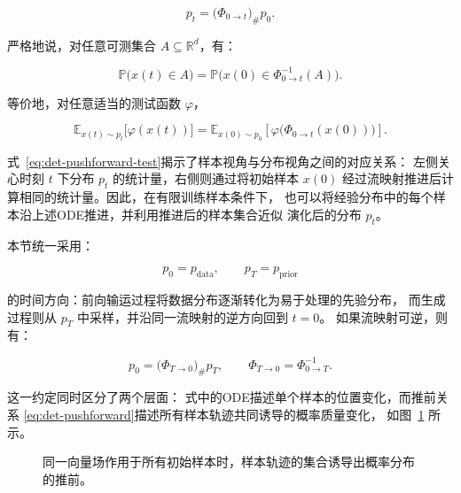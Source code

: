 \documentclass[UTF8,a4paper,zihao=-4,oneside,openany]{ctexbook}
\makeatletter
\newcommand{\AMLFigure}[2][0.96\linewidth]{%
  \begingroup
  \let\AtBeginDocument\@gobble
  \endgroup
}
\makeatother
\begin{document}
\begin{equation}
    p_t
    =
    \bigl(\Phi_{0\to t}\bigr)_{\#}p_0.
    \label{eq:det-pushforward}
\end{equation}

严格地说，对任意可测集合 $A\subseteq\mathbb{R}^{d}$，有：

\begin{equation}
    \mathbb{P}\bigl(x(t)\in A\bigr)
    =
    \mathbb{P}\bigl(
        x(0)\in\Phi_{0\to t}^{-1}(A)
    \bigr).
    \label{eq:det-pushforward-set}
\end{equation}

等价地，对任意适当的测试函数 $\varphi$，

\begin{equation}
    \mathbb{E}_{x(t)\sim p_t}
    \bigl[\varphi(x(t))\bigr]
    =
    \mathbb{E}_{x(0)\sim p_0}
    \left[
        \varphi\bigl(\Phi_{0\to t}(x(0))\bigr)
    \right].
    \label{eq:det-pushforward-test}
\end{equation}

式~\eqref{eq:det-pushforward-test}揭示了样本视角与分布视角之间的对应关系：
左侧关心时刻 $t$ 下分布 $p_t$ 的统计量，右侧则通过将初始样本
$x(0)$ 经过流映射推进后计算相同的统计量。因此，在有限训练样本条件下，
也可以将经验分布中的每个样本沿上述ODE推进，并利用推进后的样本集合近似
演化后的分布 $p_t$。

本节统一采用：

\[
    p_0=p_{\mathrm{data}},
    \qquad
    p_T=p_{\mathrm{prior}}
\]

的时间方向：前向输运过程将数据分布逐渐转化为易于处理的先验分布，
而生成过程则从 $p_T$ 中采样，并沿同一流映射的逆方向回到 $t=0$。
如果流映射可逆，则有：

\begin{equation}
    p_0
    =
    \bigl(\Phi_{T\to 0}\bigr)_{\#}p_T,
    \qquad
    \Phi_{T\to 0}
    =
    \Phi_{0\to T}^{-1}.
    \label{eq:det-generative-pushforward}
\end{equation}

这一约定同时区分了两个层面：
式中的ODE描述单个样本的位置变化，而推前关系
\eqref{eq:det-pushforward}描述所有样本轨迹共同诱导的概率质量变化，
如图~\ref{fig:pushforward} 所示。

\begin{figure}[htbp]
    \centering
    \AMLFigure{figure-pushforward}
    \caption{同一向量场作用于所有初始样本时，样本轨迹的集合诱导出概率分布的推前。}
    \label{fig:pushforward}
\end{figure}
\end{document}
